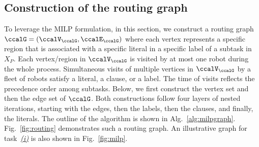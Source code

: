 \documentclass[Afour,sageh,times]{sagej}
\begin{document}
\subsection{Construction of the routing graph}\label{sec:graph}
To leverage the MILP formulation, in this section, we construct a routing graph $\ccalG = (\ccalV_{\ccalG},\ccalE_{\ccalG})$ where each vertex represents a specific region that is associated with a specific literal in a specific label of a subtask in $X_P$. Each vertex/region in $\ccalV_\ccalG$ is visited by at most one robot during the whole process. Simultaneous visits of multiple vertices in $\ccalV_\ccalG$ by a fleet of robots  satisfy a literal, a clause, or a label. The time of visits reflects the precedence order among subtasks. Below, we first construct  the vertex set and then the edge set of $\ccalG$. Both constructions follow four layers of nested iterations, starting with the edges, then the labels, then the clauses, and finally, the literals. The outline of the algorithm is shown in Alg.~\ref{alg:milpgraph}.  Fig.~\ref{fig:routing} demonstrates such a routing graph. An illustrative graph for task~\hyperref[task:i]{\it (i)}  is also shown in Fig.~\ref{fig:milp}.
\end{document}
